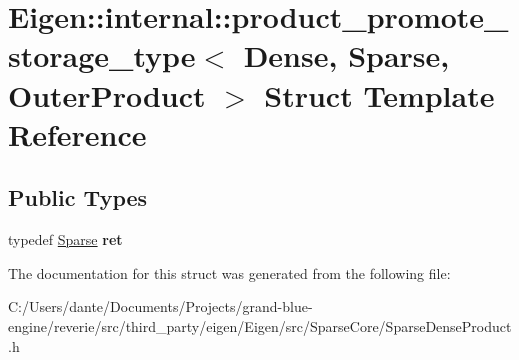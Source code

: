 \hypertarget{struct_eigen_1_1internal_1_1product__promote__storage__type_3_01_dense_00_01_sparse_00_01_outer_product_01_4}{}\section{Eigen\+::internal\+::product\+\_\+promote\+\_\+storage\+\_\+type$<$ Dense, Sparse, Outer\+Product $>$ Struct Template Reference}
\label{struct_eigen_1_1internal_1_1product__promote__storage__type_3_01_dense_00_01_sparse_00_01_outer_product_01_4}
\subsection*{Public Types}
\begin{DoxyCompactItemize}
\item 
\mbox{\label{struct_eigen_1_1internal_1_1product__promote__storage__type_3_01_dense_00_01_sparse_00_01_outer_product_01_4_ab4ca8caac8509b62ab8cd0ddacd1fc44}} 
typedef \mbox{\hyperlink{struct_eigen_1_1_sparse}{Sparse}} {\bfseries ret}
\end{DoxyCompactItemize}


The documentation for this struct was generated from the following file\+:\begin{DoxyCompactItemize}
\item 
C\+:/\+Users/dante/\+Documents/\+Projects/grand-\/blue-\/engine/reverie/src/third\+\_\+party/eigen/\+Eigen/src/\+Sparse\+Core/Sparse\+Dense\+Product.\+h\end{DoxyCompactItemize}
